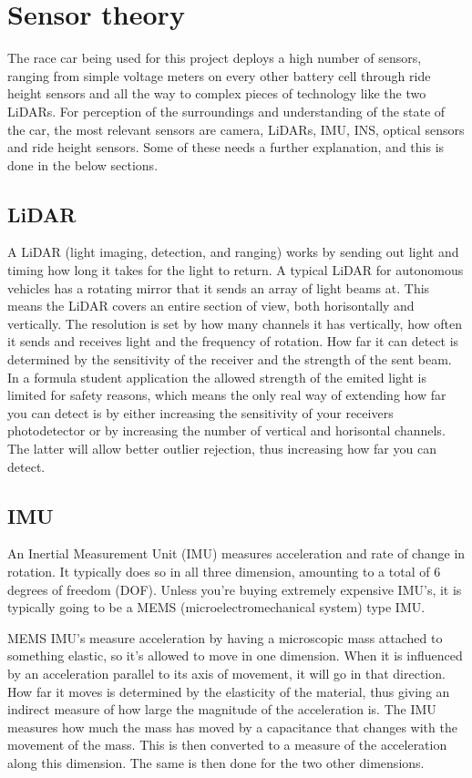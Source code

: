 \section{Sensor theory}
The race car being used for this project deploys a high number of sensors, ranging from simple voltage meters on every other battery cell through ride height sensors and all the way to complex pieces of technology like the two LiDARs. For perception of the surroundings and understanding of the state of the car, the most relevant sensors are camera, LiDARs, IMU, INS, optical sensors and ride height sensors. Some of these needs a further explanation, and this is done in the below sections.

\subsection{LiDAR}
A LiDAR (light imaging, detection, and ranging) works by sending out light and timing how long it takes for the light to return. A typical LiDAR for autonomous vehicles has a rotating mirror that it sends an array of light beams at. This means the LiDAR covers an entire section of view, both horisontally and vertically. The resolution is set by how many channels it has vertically, how often it sends and receives light and the frequency of rotation. How far it can detect is determined by the sensitivity of the receiver and the strength of the sent beam. In a formula student application the allowed strength of the emited light is limited for safety reasons, which means the only real way of extending how far you can detect is by either increasing the sensitivity of your receivers photodetector or by increasing the number of vertical and horisontal channels. The latter will allow better outlier rejection, thus increasing how far you can detect. 

\subsection{IMU}
An Inertial Measurement Unit (IMU) measures acceleration and rate of change in rotation. It typically does so in all three dimension, amounting to a total of 6 degrees of freedom (DOF). Unless you're buying extremely expensive IMU's, it is typically going to be a MEMS (microelectromechanical system) type IMU. \par MEMS IMU's measure acceleration by having a microscopic mass attached to something elastic, so it's allowed to move in one dimension. When it is influenced by an acceleration parallel to its axis of movement, it will go in that direction. How far it moves is determined by the elasticity of the material, thus giving an indirect measure of how large the magnitude of the acceleration is. The IMU measures how much the mass has moved by a capacitance that changes with the movement of the mass. This is then converted to a measure of the acceleration along this dimension. The same is then done for the two other dimensions. \\ 

